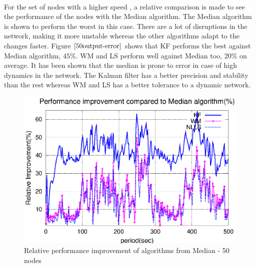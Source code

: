 \documentclass[a4paper,10pt]{report}
\begin{document}
\paragraph*{}
For the set of nodes with a higher speed , a relative comparison is made to see the performance of the nodes with the Median algorithm. The Median algorithm is shown to perform the worst in this case. There are a lot of disruptions in the network, making it more unstable whereas the other algorithms adapt to the changes faster. Figure $\ref{50output-error}$ shows that KF performs the best against Median algorithm, $45\%$. WM and LS perform well against Median too, $20\%$ on average. It has been shown that the median is prone to error in case of high dynamics in the network.\newline
The Kalman filter has a better precision and stability than the rest whereas WM and LS has a better tolerance to a dynamic network.
\begin{figure}[!h]
\centering
\includegraphics[width=0.7  \textwidth]{50output-error}
\caption{Relative performance improvement of algorithms from Median - 50 nodes} \label{50output-error}
\end{figure}
\end{document}
